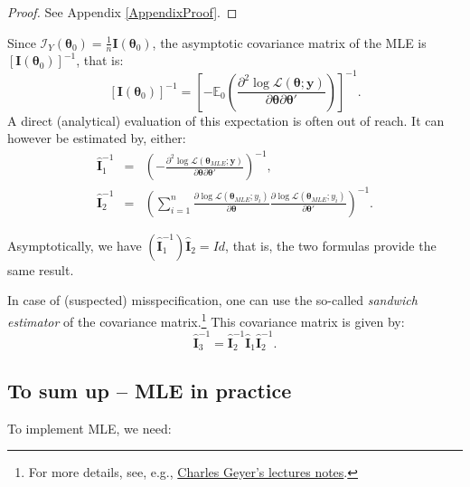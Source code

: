 \documentclass[
  12pt,
]{book}
\theoremstyle{definition}
\theoremstyle{definition}
\theoremstyle{definition}
\theoremstyle{definition}
\theoremstyle{remark}
\begin{document}
\begin{proof}
See Appendix \ref{AppendixProof}.
\end{proof}

Since \(\mathcal{I}_Y(\boldsymbol\theta_0)=\frac{1}{n}\mathbf{I}(\boldsymbol\theta_0)\), the asymptotic covariance matrix of the MLE is \([\mathbf{I}(\boldsymbol\theta_0)]^{-1}\), that is:
\[
[\mathbf{I}(\boldsymbol\theta_0)]^{-1} = \left[- \mathbb{E}_0 \left( \frac{\partial^2 \log \mathcal{L}(\boldsymbol\theta;\mathbf{y})}{\partial \boldsymbol\theta \partial \boldsymbol\theta'}\right) \right]^{-1}.
\]
A direct (analytical) evaluation of this expectation is often out of reach. It can however be estimated by, either:
\begin{eqnarray}
\hat{\mathbf{I}}_1^{-1} &=&  \left( - \frac{\partial^2 \log \mathcal{L}({\boldsymbol\theta_{MLE}};\mathbf{y})}{\partial {\boldsymbol\theta} \partial {\boldsymbol\theta}'}\right)^{-1}, \label{eq:III1}\\
\hat{\mathbf{I}}_2^{-1} &=&  \left( \sum_{i=1}^n \frac{\partial \log \mathcal{L}({\boldsymbol\theta_{MLE}};y_i)}{\partial {\boldsymbol\theta}} \frac{\partial \log \mathcal{L}({\boldsymbol\theta_{MLE}};y_i)}{\partial {\boldsymbol\theta'}} \right)^{-1}.  \label{eq:I2}
\end{eqnarray}

Asymptotically, we have \((\hat{\mathbf{I}}_1^{-1})\hat{\mathbf{I}}_2=Id\), that is, the two formulas provide the same result.

In case of (suspected) misspecification, one can use the so-called \emph{sandwich estimator} of the covariance matrix.\footnote{For more details, see, e.g., \href{https://www.stat.umn.edu/geyer/5601/notes/sand.pdf}{Charles Geyer's lectures notes}.} This covariance matrix is given by:
\begin{equation}
\hat{\mathbf{I}}_3^{-1} = \hat{\mathbf{I}}_2^{-1} \hat{\mathbf{I}}_1 \hat{\mathbf{I}}_2^{-1}.\label{eq:III3}
\end{equation}

\hypertarget{to-sum-up-mle-in-practice}{%
\subsection{To sum up -- MLE in practice}\label{to-sum-up-mle-in-practice}}

To implement MLE, we need:
\end{document}
